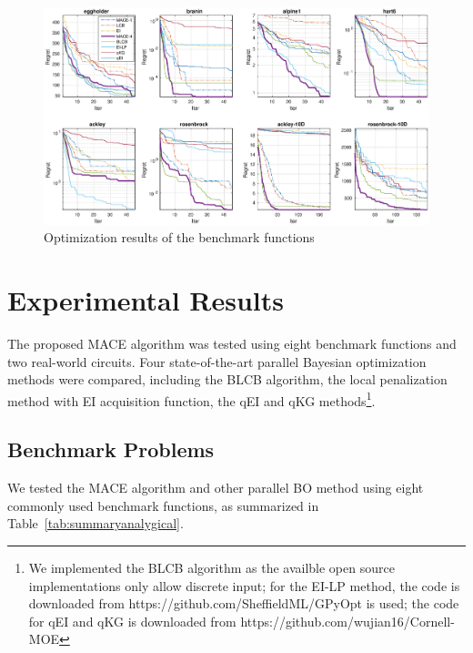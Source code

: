 
\begin{figure}[htbp]
    \begin{center}
        \centerline{\includegraphics[width=1.0\linewidth]{./img/convplot.eps}}
        \caption{Optimization results of the benchmark functions}
        \label{fig:CovPlotBenchmark}
    \end{center}
\end{figure}

\section{Experimental Results}

The proposed MACE algorithm was tested using eight benchmark functions and two
real-world circuits. Four state-of-the-art parallel Bayesian optimization
methods were compared, including the BLCB algorithm, the local penalization
method with EI acquisition function, the qEI and qKG methods\footnote{We
implemented the BLCB algorithm as the availble open source implementations only
allow discrete input; for the EI-LP method, the code is downloaded from
https://github.com/SheffieldML/GPyOpt is used; the code for qEI and qKG is
downloaded from https://github.com/wujian16/Cornell-MOE}.

\subsection{Benchmark Problems}

We tested the MACE algorithm and other parallel BO method using eight commonly used benchmark
functions, as summarized in Table~\ref{tab:summaryanalygical}.


